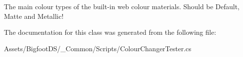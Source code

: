 The main colour types of the built-\/in web colour materials. Should be Default, Matte and Metallic! 



The documentation for this class was generated from the following file\+:\begin{DoxyCompactItemize}
\item 
Assets/\+Bigfoot\+D\+S/\+\_\+\+Common/\+Scripts/Colour\+Changer\+Tester.\+cs\end{DoxyCompactItemize}

